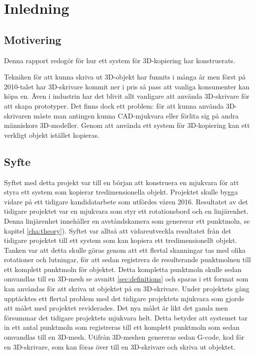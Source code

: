 \chapter{Inledning}
\label{cha:introduction}

\section{Motivering}
\label{sec:motivation}

Denna rapport redogör för hur ett system för 3D-kopiering har konstruerats. 

Tekniken för att kunna skriva ut 3D-objekt har funnits i många år men först på 2010-talet har 3D-skrivare kommit ner i pris så pass att vanliga konsumenter kan köpa en. Även i industrin har det blivit allt vanligare att använda 3D-skrivare för att skapa prototyper. Det finns dock ett problem: för att kunna använda 3D-skrivaren måste man antingen kunna CAD-mjukvara eller förlita sig på andra människors 3D-modeller. Genom att använda ett system för 3D-kopiering kan ett verkligt objekt istället kopieras.


\section{Syfte}
\label{sec:aim}

Syftet med detta projekt var till en början att konstruera en mjukvara för att styra ett system som kopierar tredimensionella objekt. Projektet skulle bygga vidare på ett tidigare kandidatarbete som utfördes våren 2016. Resultatet av det tidigare projektet var en mjukvara som styr ett rotationsbord och en linjärenhet. Denna linjärenhet innehåller en avståndskamera som genererar ett punktmoln, se kapitel \ref{cha:theory}). Syftet var alltså att vidareutveckla resultatet från det tidigare projektet till ett system som kan kopiera ett tredimensionellt objekt. Tanken var att detta skulle göras genom att ett flertal skanningar tas med olika rotationer och lutningar, för att sedan registrera de resulterande punktmolnen till ett komplett punktmoln för objektet. Detta kompletta punktmoln skulle sedan omvandlas till en 3D-mesh se avsnitt \ref{sec:definitions} och sparas i ett format som kan användas för att skriva ut objektet på en 3D-skrivare.  Under projektets gång upptäcktes ett flertal problem med det tidigare projektets mjukvara som gjorde att målet med projektet reviderades. Det nya målet är likt det gamla men försummar det tidigare projektets mjukvara helt. Detta betyder att systemet tar in ett antal punktmoln som registreras till ett komplett punktmoln som sedan omvandlas till en 3D-mesh. Utifrån 3D-meshen genereras sedan G-code, kod för en 3D-skrivare, som kan föras över till en 3D-skrivare och skriva ut objektet.


